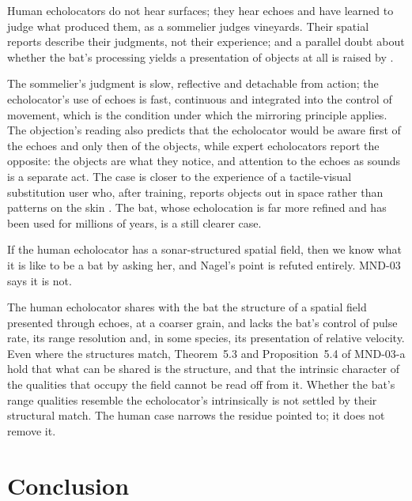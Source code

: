 \documentclass{situationist-preprint}
\begin{document}
\begin{objection}
Human echolocators do not hear surfaces; they hear echoes and have learned to judge what produced them, as a sommelier judges vineyards. Their spatial reports describe their judgments, not their experience; and a parallel doubt about whether the bat's processing yields a presentation of objects at all is raised by \citet{Akins1993}.
\end{objection}

\begin{reply}
The sommelier's judgment is slow, reflective and detachable from action; the echolocator's use of echoes is fast, continuous and integrated into the control of movement, which is the condition under which the mirroring principle applies. The objection's reading also predicts that the echolocator would be aware first of the echoes and only then of the objects, while expert echolocators report the opposite: the objects are what they notice, and attention to the echoes as sounds is a separate act. The case is closer to the experience of a tactile-visual substitution user who, after training, reports objects out in space rather than patterns on the skin \citep{BachyRita1969}. The bat, whose echolocation is far more refined and has been used for millions of years, is a still clearer case.
\end{reply}

\begin{objection}
If the human echolocator has a sonar-structured spatial field, then we know what it is like to be a bat by asking her, and Nagel's point is refuted entirely. MND-03 says it is not.
\end{objection}

\begin{reply}
The human echolocator shares with the bat the structure of a spatial field presented through echoes, at a coarser grain, and lacks the bat's control of pulse rate, its range resolution and, in some species, its presentation of relative velocity. Even where the structures match, Theorem~5.3 and Proposition~5.4 of MND-03-a hold that what can be shared is the structure, and that the intrinsic character of the qualities that occupy the field cannot be read off from it. Whether the bat's range qualities resemble the echolocator's intrinsically is not settled by their structural match. The human case narrows the residue \citet{Nagel1974} pointed to; it does not remove it.
\end{reply}

\section{Conclusion}
\end{document}
